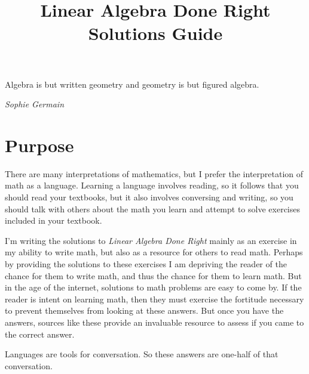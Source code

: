 \documentclass{article}
\title{Linear Algebra Done Right\\Solutions Guide}
\author{}
\date{}
\begin{document}
\maketitle

\epigraph{Algebra is but written geometry and geometry is but figured algebra.}{\textit{Sophie Germain}}

\section{Purpose}
There are many interpretations of mathematics, but I prefer the interpretation of math as a language. Learning a language involves reading, so it follows that you should read your textbooks, but it also involves conversing and writing, so you should talk with others about the math you learn and attempt to solve exercises included in your textbook.

I'm writing the solutions to \textit{Linear Algebra Done Right} mainly as an exercise in my ability to write math, but also as a resource for others to read math. Perhaps by providing the solutions to these exercises I am depriving the reader of the chance for them to write math, and thus the chance for them to learn math. But in the age of the internet, solutions to math problems are easy to come by. If the reader is intent on learning math, then they must exercise the fortitude necessary to prevent themselves from looking at these answers. But once you have the answers, sources like these provide an invaluable resource to assess if you came to the correct answer.

Languages are tools for conversation. So these answers are one-half of that conversation.
\end{document}
